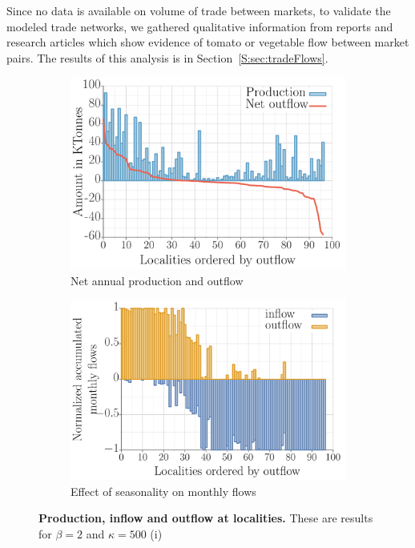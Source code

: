 \documentclass[11pt]{article}
\theoremstyle{definition}
\begin{document}
Since no data is available on volume of trade between markets, to validate
the modeled trade networks, we gathered qualitative information from
reports and research articles which show evidence of tomato or vegetable
flow between market pairs. The results of this analysis is in
Section~\ref{S:sec:tradeFlows}.  
\begin{figure}[ht]
    \centering
\begin{subfigure}[b]{.47\textwidth}
    \includegraphics[width=\textwidth]{../long_distance/results/prod_netout_flows_precip1_b2_k500.pdf}
    \caption{Net annual production and outflow\label{fig:prod_netout}}
\end{subfigure}\hspace{.5cm}
\begin{subfigure}[b]{.47\textwidth}
    \includegraphics[width=\textwidth]{../long_distance/results/monthly_in_out_flows_precip1_b2_k500.pdf}
    \caption{Effect of seasonality on monthly flows\label{fig:monthly_in_out}}
\end{subfigure}
\caption{\textbf{Production, inflow and outflow at localities.} These are
results for $\beta=2$ and $\kappa=500$ (i) \label{fig:tradeProps}}
\end{figure}
\end{document}
